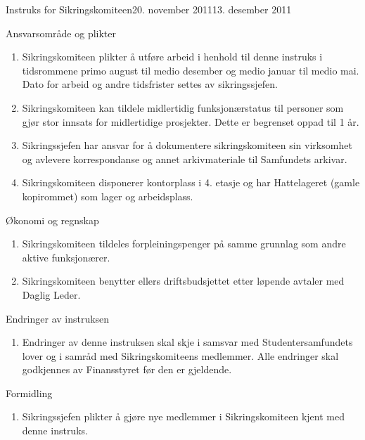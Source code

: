 \begin{instruks}{Instruks for Sikringskomiteen}{20. november 2011}{13. desember 2011}
\begin{instruksledd}{Ansvarsområde og plikter}
\begin{enumerate}
                forbindelse med dette overholdes.
            \item Sikringskomiteen plikter å utføre arbeid i henhold til denne instruks i
                tidsrommene primo august til medio
                desember og medio januar til medio mai. Dato for arbeid og andre
                tidsfrister settes av sikringssjefen.
            \item Sikringskomiteen kan tildele midlertidig funksjonærstatus til personer
                som gjør stor innsats for midlertidige
                prosjekter. Dette er begrenset oppad til 1 år.
            \item Sikringssjefen har ansvar for å dokumentere sikringskomiteen sin
                virksomhet og avlevere korrespondanse og annet arkivmateriale til Samfundets arkivar.
	    \item Sikringskomiteen disponerer kontorplass i 4. etasje og har Hattelageret (gamle
		kopirommet) som lager og arbeidsplass.
        \end{enumerate}
    \end{instruksledd}

    \begin{instruksledd}{Økonomi og regnskap}
        \begin{enumerate}
            \item Sikringskomiteen tildeles forpleiningspenger på samme grunnlag som andre aktive
                funksjonærer.
            \item Sikringskomiteen benytter ellers driftsbudsjettet etter løpende avtaler med
                Daglig Leder.
        \end{enumerate}
    \end{instruksledd}

    \begin{instruksledd}{ Endringer av instruksen}
        \begin{enumerate}
            \item Endringer av denne instruksen skal skje i samsvar med Studentersamfundets lover
                og i samråd med
                Sikringskomiteens medlemmer. Alle endringer skal godkjennes av Finansstyret før
                den er gjeldende.
        \end{enumerate}
    \end{instruksledd}

    \begin{instruksledd}{Formidling}
        \begin{enumerate}
            \item Sikringssjefen plikter å gjøre nye medlemmer i Sikringskomiteen kjent med denne
                instruks.
        \end{enumerate}
    \end{instruksledd}

\end{instruks}





